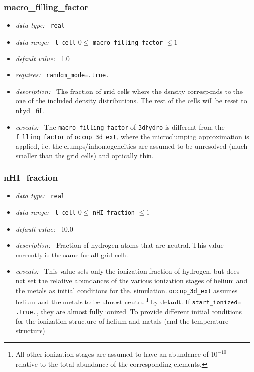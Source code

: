 \documentclass[a4paper,10pt]{article}
\begin{document}
\begin{appendix}
\subsubsection{macro\_filling\_factor}
\label{hydoptnl:macrofillingfactor}
\begin{itemize}
 \item \textit{data type:~} \texttt{real}
 \item \textit{data range:~} \texttt{l\_cell} $0 \leq$ 
 \texttt{macro\_filling\_factor}
                             $\leq 1$
 \item \textit{default value:~} 1.0
 \item \textit{requires:~} 
  \hyperref[hydopt:randommode]{\texttt{random\_mode}}\texttt{=.true.}
 \item \textit{description:~} The fraction of grid cells where the density 
  corresponds to the one of the included density distributions. The rest of 
  the cells will be reset to \hyperref[hydopt:nhydfill]{nhyd\_fill}.
 \item \textit{caveats:~}-The \texttt{macro\_filling\_factor} of 
  \texttt{3dhydro} is different from the \texttt{filling\_factor}  of 
  \texttt{occup\_3d\_ext}, where the microclumping approximation is applied,
  i.e. the clumps/inhomogeneities are assumed to be unresolved (much smaller 
  than the grid cells) and optically thin.
\end{itemize}

\subsubsection{nHI\_fraction}
\label{hydoptnl:nhifraction}
\begin{itemize}
 \item \textit{data type:~} \texttt{real}
 \item \textit{data range:~} \texttt{l\_cell} $0 \leq$ \texttt{nHI\_fraction}
  $\leq 1$
 \item \textit{default value:~} 10.0
 \item \textit{description:~} Fraction of hydrogen atoms that are neutral. 
  This value currently is the same for all grid cells.
 \item \textit{caveats:~} This value sets only the ionization fraction of
  hydrogen, but does not set the relative abundances of the various 
  ionization stages of helium and the metals as initial conditions for the. 
  simulation. \texttt{occup\_3d\_ext} assumes helium and the metals to be 
  almost neutral\footnote{All other ionization stages are assumed to have an 
  abundance of $10^{-10}$ relative to the total abundance of the 
  corresponding elements.} by default. If 
  \hyperref[opt:startionized]{\texttt{start\_ionized}}\texttt{= .true.}, they 
  are almost fully ionized. To provide different initial conditions for the 
ionization structure of helium and metals (and the temperature structure)
\end{itemize}



\end{appendix}
\end{document}
